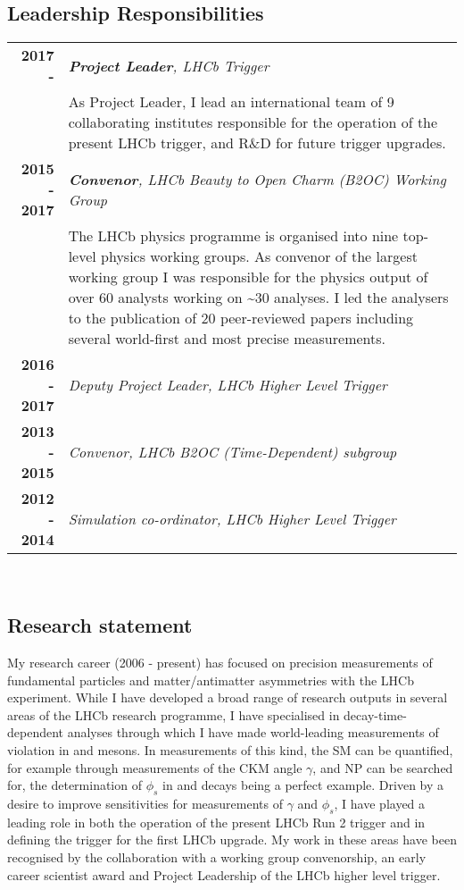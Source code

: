 \subsection*{Leadership Responsibilities} 
\begin{flushleft}
\begin{tabular}{rp{14cm}}
  \bf{2017 - \phantom{2018}} & \textsl{\textbf{Project Leader}, LHCb Trigger} \\
  & As Project Leader, I lead an international team of 9 collaborating institutes responsible for the operation of the present LHCb trigger, and R\&D for future trigger upgrades. \\
  \bf{2015 - 2017} & \textsl{\textbf{Convenor}, LHCb Beauty to Open Charm (B2OC) Working Group}  \\
    & The LHCb physics programme is organised into nine top-level physics working groups. As convenor of the largest working group I was responsible for the physics output of over 60 analysts working on \sim30 analyses. I led the analysers to the publication of 20 peer-reviewed papers including several world-first and most precise measurements. \\
  \bf{2016 - 2017} & \textsl{Deputy Project Leader, LHCb Higher Level Trigger} \\
  \bf{2013 - 2015} & \textsl{Convenor, LHCb B2OC (Time-Dependent) subgroup}\\
  \bf{2012 - 2014} & \textsl{Simulation co-ordinator, LHCb Higher Level Trigger} \\
\end{tabular}
\end{flushleft}

~

\subsection*{Research statement}

My research career (2006 - present) has focused on precision measurements of fundamental particles and matter/antimatter asymmetries with the LHCb experiment. While I have developed a broad range of research outputs in several areas of the LHCb research programme, I have specialised in decay-time-dependent analyses through which I have made world-leading measurements of \CP violation in \PBz and \PBs mesons. In measurements of this kind, the SM can be quantified, for example through measurements of the CKM angle $\gamma$, and NP can be searched for, the determination of $\phi_s$ in \HepProcess{\PBs\to\PJpsi\Pphi} and \HepProcess{\PBs\to\PDsplus\PDsminus} decays being a perfect example. Driven by a desire to improve sensitivities for measurements of $\gamma$ and $\phi_s$, I have played a leading role in both the operation of the present LHCb Run 2 trigger and in defining the trigger for the first LHCb upgrade. My work in these areas have been recognised by the collaboration with a working group convenorship, an early career scientist award and Project Leadership of the LHCb higher level trigger. 


